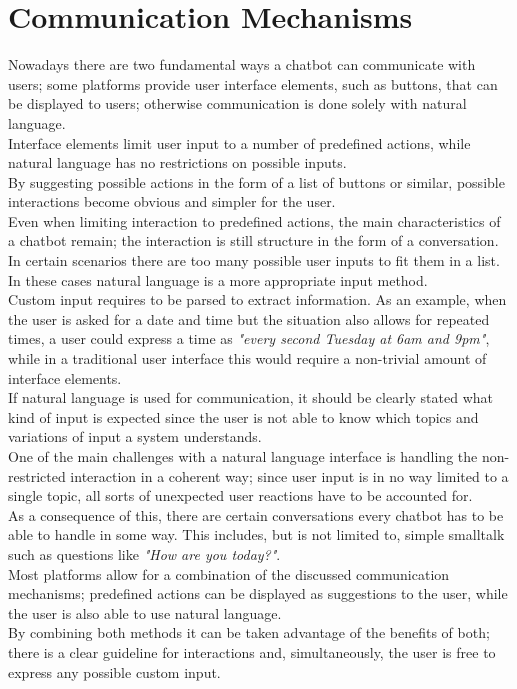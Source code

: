\section{Communication Mechanisms}
\label{communication}


Nowadays there are two fundamental ways a chatbot can communicate with users;
some platforms provide user interface elements, such as buttons, that can be displayed to users;
otherwise communication is done solely with natural language.
\\

Interface elements limit user input to a number of predefined actions,
while natural language has no restrictions on possible inputs.
\\
By suggesting possible actions in the form of a list of buttons or similar,
possible interactions become obvious and simpler for the user.
\\
Even when limiting interaction to predefined actions,
the main characteristics of a chatbot remain;
the interaction is still structure in the form of a conversation.
\\

In certain scenarios there are too many possible user inputs to fit them in a list.
In these cases natural language is a more appropriate input method.
\\
Custom input requires to be parsed to extract information.
As an example, when the user is asked for a date and time but the situation also allows for repeated times,
a user could express a time as \emph{"every second Tuesday at 6am and 9pm"},
while in a traditional user interface this would require a non-trivial amount of interface elements.
\\

If natural language is used for communication,
it should be clearly stated what kind of input is expected
since the user is not able to know which topics and variations of input a system understands.
\\
One of the main challenges with a natural language interface is handling the non-restricted interaction
in a coherent way;
since user input is in no way limited to a single topic,
all sorts of unexpected user reactions have to be accounted for.
\\
As a consequence of this, there are certain conversations every chatbot has to be able to handle in some way.
This includes, but is not limited to, simple smalltalk such as questions like \emph{"How are you today?"}.
\\

Most platforms allow for a combination of the discussed communication mechanisms;
predefined actions can be displayed as suggestions to the user,
while the user is also able to use natural language.
\\
By combining both methods it can be taken advantage of the benefits of both;
there is a clear guideline for interactions and, simultaneously,
the user is free to express any possible custom input.
